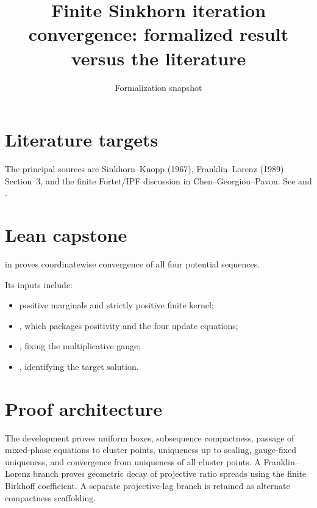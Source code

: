\title{Finite Sinkhorn iteration convergence: formalized result versus the literature}
\author{}
\date{Formalization snapshot \snapshot}

\maketitle
{}
\section{Literature targets}
The principal sources are Sinkhorn--Knopp (1967), Franklin--Lorenz (1989) Section~3, and the finite Fortet/IPF discussion in Chen--Georgiou--Pavon.  See
 and
.

\section{Lean capstone}
 in
 proves coordinatewise convergence of all four potential sequences.

Its inputs include:
\begin{itemize}[leftmargin=2em]
\item positive marginals and strictly positive finite kernel;
\item {}, which packages positivity and the four update equations;
\item {}, fixing the multiplicative gauge;
\item {}, identifying the target solution.
\end{itemize}

\section{Proof architecture}
The development proves uniform boxes, subsequence compactness, passage of mixed-phase equations to cluster points, uniqueness up to scaling, gauge-fixed uniqueness, and convergence from uniqueness of all cluster points.  A Franklin--Lorenz branch proves geometric decay of projective ratio spreads using the finite Birkhoff coefficient.  A separate projective-lag branch is retained as alternate compactness scaffolding.

